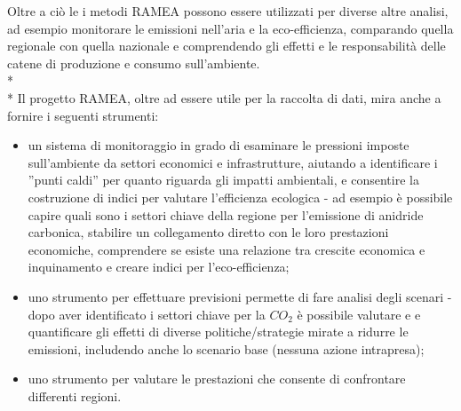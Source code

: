 \documentclass[12pt,a4paper,openright,twoside]{report}
\begin{document}
Oltre a ciò le i metodi RAMEA possono essere utilizzati per diverse altre analisi, ad esempio monitorare le emissioni nell'aria e la eco-efficienza, comparando quella regionale con quella nazionale e comprendendo gli effetti e le responsabilità delle catene di produzione e consumo sull'ambiente. \\*\\*
Il progetto RAMEA, oltre ad essere utile per la raccolta di dati, mira anche a fornire i seguenti strumenti:
\begin{itemize}
\item un sistema di monitoraggio in grado di esaminare le pressioni imposte sull'ambiente da settori economici e infrastrutture, aiutando a identificare i ''punti caldi'' per quanto riguarda gli impatti ambientali, e consentire la costruzione di indici per valutare l'efficienza ecologica - ad esempio è possibile capire quali sono i settori chiave della regione per l'emissione di anidride carbonica, stabilire un collegamento diretto con le loro prestazioni economiche, comprendere se esiste una relazione tra crescite economica e inquinamento e creare indici per l'eco-efficienza;
\item uno strumento per effettuare previsioni permette di fare analisi degli scenari - dopo aver identificato i settori chiave per la $CO_2$ è possibile valutare e e quantificare gli effetti di diverse politiche/strategie mirate a ridurre le emissioni, includendo anche lo scenario base (nessuna azione intrapresa);
\item uno strumento per valutare le prestazioni che consente di confrontare differenti regioni. 
\end{itemize}
 
\end{document}
